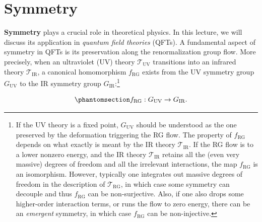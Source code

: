 \documentclass[
  letterpaper,
  DIV=11,
  numbers=noendperiod]{scrreport}
\begin{document}
\section{Symmetry}\label{symmetry}

\textbf{Symmetry} plays a crucial role in theoretical physics. In this
lecture, we will discuss its application in \emph{quantum field
theories} (QFTs). A fundamental aspect of symmetry in QFTs is its
preservation along the renormalization group flow. More precisely, when
an ultraviolet (UV) theory \(\mathcal{T}_\text{UV}\) transitions into an
infrared theory \(\mathcal{T}_\text{IR}\), a canonical homomorphism
\(f_\text{RG}\) exists from the UV symmetry group \(G_\text{UV}\) to the
IR symmetry group \(G_\text{IR}\):\footnote{If the UV theory is a fixed
  point, \(G_\text{UV}\) should be understood as the one preserved by
  the deformation triggering the RG flow. The property of
  \(f_\text{RG}\) depends on what exactly is meant by the IR theory
  \(\mathcal{T}_\text{IR}\). If the RG flow is to a lower nonzero
  energy, and the IR theory \(\mathcal{T}_\text{IR}\) retains all the
  (even very massive) degrees of freedom and all the irrelevant
  interactions, the map \(f_\text{RG}\) is an isomorphism. However,
  typically one integrates out massive degrees of freedom in the
  description of \(\mathcal{T}_\text{RG}\), in which case some symmetry
  can decouple and thus \(f_\text{RG}\) can be non-surjective. Also, if
  one also drops some higher-order interaction terms, or runs the flow
  to zero energy, there can be an \emph{emergent} symmetry, in which
  case \(f_\text{RG}\) can be non-injective.}

\begin{tcolorbox}[enhanced jigsaw, left=2mm, toprule=.15mm, bottomtitle=1mm, titlerule=0mm, leftrule=.75mm, colframe=quarto-callout-important-color-frame, opacitybacktitle=0.6, title=\textcolor{quarto-callout-important-color}{\faExclamation}\hspace{0.5em}{RG flow homomorphism from UV symmetry to IR symmetry}, bottomrule=.15mm, breakable, arc=.35mm, toptitle=1mm, colbacktitle=quarto-callout-important-color!10!white, rightrule=.15mm, opacityback=0, coltitle=black, colback=white]

\begin{equation}\phantomsection\label{eq-RG-group-match}{
f_\text{RG} : G_\text{UV} \to G_\text{IR}.
}\end{equation}

\end{tcolorbox}
\end{document}
